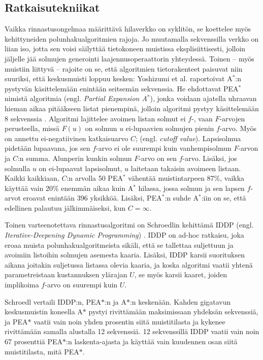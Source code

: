 \documentclass[finnish]{tktltiki2}
\theoremstyle{definition}
\theoremstyle{remark}
\begin{document}
\subsection{Ratkaisutekniikat}
Vaikka rinnastusongelmaa määrittävä hilaverkko on syklitön, se koettelee myös kehittyneiden polunhakualgoritmien rajoja. Jo muutamalla sekvenssilla verkko on liian iso, jotta sen voisi säilyttää tietokoneen muistissa eksplisiittisesti, jolloin jäljelle jää solmujen generointi laajennusoperaattorin yhteydessä. Toinen -- myös muistiin liittyvä -- rajoite on se, että algoritmien tietorakenteet paisuvat niin suuriksi, että keskusmuisti loppuu kesken: Yoshizumi et al. raportoivat A$^{\ast}$:n pystyvän käsittelemään enintään seitsemän sekvenssia. He ehdottavat PEA$^{\ast}$ nimistä algoritmia (engl. \textit{Partial Expansion A}$^\ast$), jonka voidaan ajatella uhraavan hieman aikaa pitääkseen listat pienempinä, jolloin algoritmi pystyy käsittelemään 8 sekvenssia \cite{Yoshizumi00}. Algoritmi lajittelee avoimen listan solmut ei $f$-, vaan $F$-arvojen perusteella, missä $F(u)$ on solmun $u$ ei-lupaavien solmujen pienin $f$-arvo. Myös on annettu ei-negatiivinen katkaisuarvo $C$; (engl. \textit{cutoff value}). Lapsisolmua pidetään lupaavana, jos sen $f$-arvo ei ole suurempi kuin vanhempisolmun $F$-arvon ja $C$:n summa. Alunperin kunkin solmun $F$-arvo on sen $f$-arvo. Lisäksi, jos solmulla $u$ on ei-lupaavat lapsisolmut, $u$ laitetaan takaisin avoimeen listaan. Kaikki kaikkiaan, $C$:n arvolla 50 PEA$^{\ast}$ vähentää muistintarpeen 87\%, vaikka käyttää vain 20\% enemmän aikaa kuin A$^{\ast}$ hilassa, jossa solmun ja sen lapsen $f$-arvot eroavat enintään 396 yksikköä. Lisäksi, PEA$^{\ast}$:n suhde A$^{\ast}$:iin on se, että edellinen palautuu jälkimmäiseksi, kun $C = \infty$.

Toinen varteenotettava rinnastusalgoritmi on Schroedlin kehittämä IDDP (engl. \textit{Iterative-Deepening Dynamic Programming}) \cite{Schroedl05}. IDDP on ad-hoc ratkaisu, joka eroaa muista polunhakualgoritmeista sikäli, että se tallettaa suljettuun ja avoimiin listoihin solmujen asemesta kaaria. Lisäksi, IDDP karsii suorituksen aikana joitakin suljetussa listassa olevia kaaria, ja koska algoritmi vaatii yhtenä parametreistaan kustannuksen ylärajan $U$, se myös karsii kaaret, joiden implikoima $f$-arvo on suurempi kuin $U$.

Schroedl vertaili IDDP:n, PEA$\ast$:n ja A$\ast$:n keskenään. Kahden gigatavun keskusmuistin koneella A$\ast$ pystyi rivittämään maksimissaan yhdeksän sekvenssiä, ja PEA$\ast$ vaatii vain noin yhden prosentin siitä muistitilasta ja kykenee rivittämään samalla alustalla 12 sekvenssiä. 12 sekvenssillä IDDP vaatii vain noin 67 prosenttiä PEA$\ast$:n laskenta-ajasta ja käyttää vain kuudennen osan siitä muistitilasta, mitä PEA$\ast$.
\end{document}
